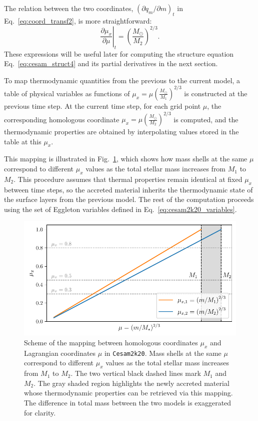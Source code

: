 \documentclass[12pt,a4paper]{article}
\newcommand{\pfird}[2][]{\frac{\partial#1}{\partial#2}}
\begin{document}
The relation between the two coordinates, $\left(\partial q_m/\partial m\right)_t$ in Eq.~\eqref{eq:coord_transf2}, is more straightforward:
\begin{equation}
  \left.\pfird[\mu_x]{\mu}\right|_t = \left(\frac{M_\odot}{M_2}\right)^{2/3}. 
\end{equation}
These expressions will be useful later for computing the structure equation Eq.~\eqref{eq:cesam_struct4} and its partial derivatives in the next section.

To map thermodynamic quantities from the previous to the current model, a table of physical variables as functions of $\mu_x = \mu \left(\frac{M_\odot}{M_1}\right)^{2/3}$ is constructed at the previous time step. At the current time step, for each grid point $\mu$, the corresponding homologous coordinate $\mu_x = \mu \left(\frac{M_\odot}{M_2}\right)^{2/3}$ is computed, and the thermodynamic properties are obtained by interpolating values stored in the table at this $\mu_x$. 

This mapping is illustrated in Fig.~\ref{fig:mapping_coordinates}, which shows how mass shells at the same $\mu$ correspond to different $\mu_x$ values as the total stellar mass increases from $M_1$ to $M_2$. This procedure assumes that thermal properties remain identical at fixed $\mu_x$ between time steps, so the accreted material inherits the thermodynamic state of the surface layers from the previous model. The rest of the computation proceeds using the set of Eggleton variables defined in Eq.~\eqref{eq:cesam2k20_variables}.

\begin{figure}
  \centering
  \includegraphics[width=.7\textwidth]{mapping_coordinates.pdf}
  \caption{Scheme of the mapping between homologous coordinates $\mu_x$ and Lagrangian coordinates $\mu$ in \texttt{Cesam2k20}. Mass shells at the same $\mu$ correspond to different $\mu_x$ values as the total stellar mass increases from $M_1$ to $M_2$. The two vertical black dashed lines mark $M_1$ and $M_2$. The gray shaded region highlights the newly accreted material whose thermodynamic properties can be retrieved via this mapping. The difference in total mass between the two models is exaggerated for clarity.} \label{fig:mapping_coordinates}
\end{figure}
\end{document}
